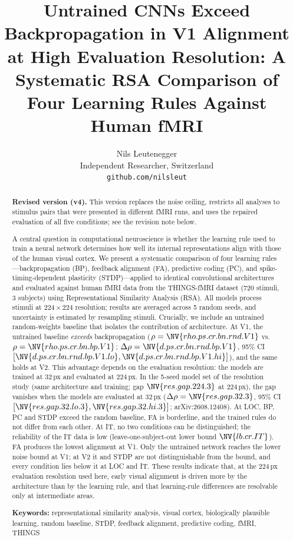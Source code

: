 \documentclass[10pt,twocolumn]{article}
\title{Untrained CNNs Exceed Backpropagation in V1 Alignment at High Evaluation Resolution: A Systematic RSA Comparison of Four Learning Rules Against Human fMRI}
\author{Nils Leutenegger\\
Independent Researcher, Switzerland\\
\texttt{github.com/nilsleut}}
\date{}
\newcommand{\newid}{arXiv:2608.12408}
\newcommand{\rs}[2]{\NV{rho.ps.cr.bn.#1.#2}}
\newcommand{\dps}[3]{\NV{d.ps.cr.bn.#1.#2.#3}}
\newcommand{\dpsci}[3]{[\NV{d.ps.cr.bn.#1.#2.#3.lo},\NV{d.ps.cr.bn.#1.#2.#3.hi}]}
\newcommand{\lb}[1]{\NV{lb.cr.#1}}
\begin{document}
\maketitle

\begin{abstract}
\noindent\textbf{Revised version (v4).} This version replaces the noise ceiling, restricts all
analyses to stimulus pairs that were presented in different fMRI runs, and uses the repaired
evaluation of all five conditions; see the revision note below.

\medskip

A central question in computational neuroscience is whether the learning rule used to train a neural network determines how well its internal representations align with those of the human visual cortex. We present a systematic comparison of four learning rules---backpropagation (BP), feedback alignment (FA), predictive coding (PC), and spike-timing-dependent plasticity (STDP)---applied to identical convolutional architectures and evaluated against human fMRI data from the THINGS-fMRI dataset (720 stimuli, 3 subjects) using Representational Similarity Analysis (RSA). All models process stimuli at $224\times224$ resolution; results are averaged across 5 random seeds, and uncertainty is estimated by resampling stimuli. Crucially, we include an untrained random-weights baseline that isolates the contribution of architecture. At V1, the untrained baseline \emph{exceeds} backpropagation ($\rho = \rs{rnd}{V1}$ vs.\ $\rho = \rs{bp}{V1}$; $\Delta\rho = \dps{rnd}{bp}{V1}$, 95\% CI $\dpsci{rnd}{bp}{V1}$), and the same holds at V2. This advantage depends on the evaluation resolution: the models are trained at $32$\,px and evaluated at $224$\,px. In the 5-seed model set of the resolution study (same architecture and training; gap $\NV{res.gap.224.3}$ at $224$\,px), the gap vanishes when the models are evaluated at $32$\,px ($\Delta\rho = \NV{res.gap.32.3}$, 95\% CI $[\NV{res.gap.32.lo.3}, \NV{res.gap.32.hi.3}]$; \newid). At LOC, BP, PC and STDP exceed the random baseline, FA is borderline, and the trained rules do not differ from each other. At IT, no two conditions can be distinguished; the reliability of the IT data is low (leave-one-subject-out lower bound $\lb{IT}$). FA produces the lowest alignment at V1. Only the untrained network reaches the lower noise bound at V1; at V2 it and STDP are not distinguishable from the bound, and every condition lies below it at LOC and IT. These results indicate that, at the $224$\,px evaluation resolution used here, early visual alignment is driven more by the architecture than by the learning rule, and that learning-rule differences are resolvable only at intermediate areas.

\medskip
\noindent\textbf{Keywords:} representational similarity analysis, visual cortex, biologically plausible learning, random baseline, STDP, feedback alignment, predictive coding, fMRI, THINGS
\end{abstract}
\end{document}
